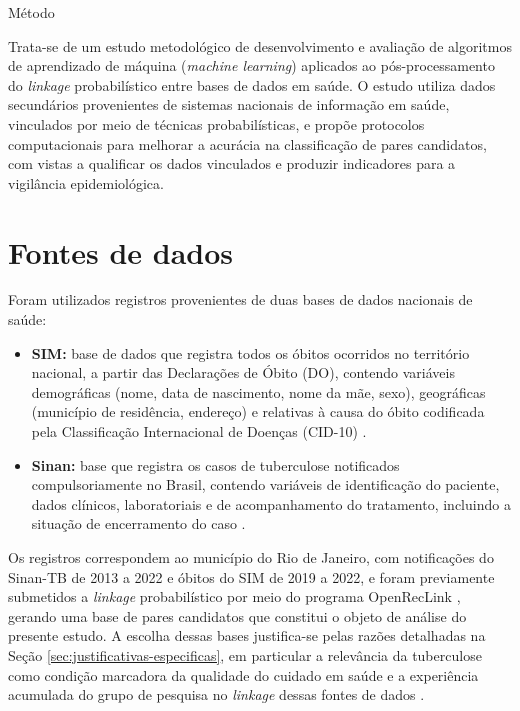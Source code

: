 \begin{chapter}{Método}\label{cap:metodo}

Trata-se de um estudo metodológico de desenvolvimento e avaliação de algoritmos de aprendizado de máquina (\textit{machine learning}) aplicados ao pós-processamento do \textit{linkage} probabilístico entre bases de dados em saúde. O estudo utiliza dados secundários provenientes de sistemas nacionais de informação em saúde, vinculados por meio de técnicas probabilísticas, e propõe protocolos computacionais para melhorar a acurácia na classificação de pares candidatos, com vistas a qualificar os dados vinculados e produzir indicadores para a vigilância epidemiológica.

\section{Fontes de dados}\label{sec:fontes-dados}

Foram utilizados registros provenientes de duas bases de dados nacionais de saúde:

\begin{itemize}
\item \textbf{SIM:} base de dados que registra todos os óbitos ocorridos no território nacional, a partir das Declarações de Óbito (DO), contendo variáveis demográficas (nome, data de nascimento, nome da mãe, sexo), geográficas (município de residência, endereço) e relativas à causa do óbito codificada pela Classificação Internacional de Doenças (CID-10) \cite{Jorge2007qualidade}.

\item \textbf{Sinan:} base que registra os casos de tuberculose notificados compulsoriamente no Brasil, contendo variáveis de identificação do paciente, dados clínicos, laboratoriais e de acompanhamento do tratamento, incluindo a situação de encerramento do caso \cite{Rocha2019scripting}.
\end{itemize}

Os registros correspondem ao município do Rio de Janeiro, com notificações do Sinan-TB de 2013 a 2022 e óbitos do SIM de 2019 a 2022, e foram previamente submetidos a \textit{linkage} probabilístico por meio do programa OpenRecLink \cite{Camargo2000reclink}, gerando uma base de pares candidatos que constitui o objeto de análise do presente estudo. A escolha dessas bases justifica-se pelas razões detalhadas na Seção \ref{sec:justificativas-especificas}, em particular a relevância da tuberculose como condição marcadora da qualidade do cuidado em saúde e a experiência acumulada do grupo de pesquisa no \textit{linkage} dessas fontes de dados \cite{Oliveira2012uso, Bartholomay2014improved, Oliveira2016accuracy}.


\end{chapter}
